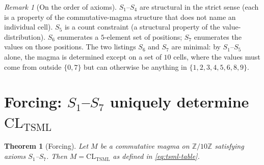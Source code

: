 \documentclass[11pt,reqno]{amsart}
\theoremstyle{plain}
\newtheorem{theorem}{Theorem}[section]
\theoremstyle{definition}
\theoremstyle{remark}
\newtheorem*{remark}{Remark}
\newcommand{\Z}{\mathbb{Z}}
\newcommand{\TSML}{\mathrm{TSML}}
\newcommand{\CL}{\mathrm{CL}}
\begin{document}
\begin{remark}[On the order of axioms]
$S_{1}$--$S_{4}$ are structural in the strict sense (each is a
property of the commutative-magma structure that does not name an
individual cell). $S_{5}$ is a count constraint (a structural
property of the value-distribution). $S_{6}$ enumerates a $5$-element
set of positions; $S_{7}$ enumerates the values on those positions.
The two listings $S_{6}$ and $S_{7}$ are minimal: by $S_{1}$--$S_{5}$
alone, the magma is determined except on a set of $10$ cells, where
the values must come from outside $\{0, 7\}$ but can otherwise be
anything in $\{1, 2, 3, 4, 5, 6, 8, 9\}$.
\end{remark}

\section{Forcing: $S_{1}$--$S_{7}$ uniquely determine $\CL_{\TSML}$}
\label{sec:forcing}

\begin{theorem}[Forcing]
\label{thm:forcing}
Let $M$ be a commutative magma on $\Z/10\Z$ satisfying axioms
$S_{1}$--$S_{7}$. Then $M = \CL_{\TSML}$ as defined in
\eqref{eq:tsml-table}.
\end{theorem}
\end{document}
